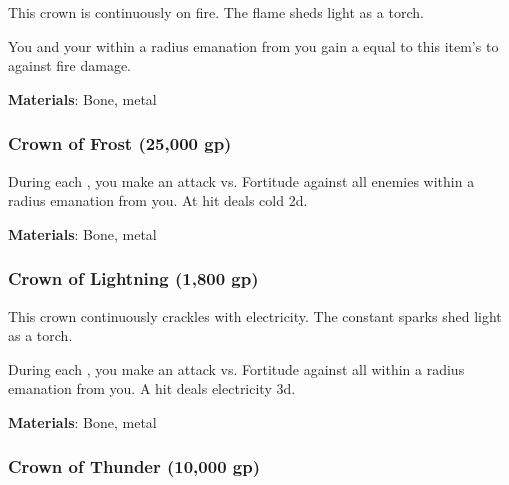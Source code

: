 This crown is continuously on fire.
The flame sheds light as a torch.

You and your  within a \arealarge radius emanation from you
gain a  equal to this item's  to  against fire damage.



\vspace{0.25em}
\textbf{Materials}: Bone, metal


\lowercase{\hypertarget{item:Crown of Frost}{}}\label{item:Crown of Frost}
\hypertarget{item:Crown of Frost}{\subsubsection{Crown of Frost\hfill{} (25,000 gp)}}

During each , you make an attack vs. Fortitude against all enemies within a \areasmall radius emanation from you.
At hit deals cold  \minus2d.



\vspace{0.25em}
\textbf{Materials}: Bone, metal


\lowercase{\hypertarget{item:Crown of Lightning}{}}\label{item:Crown of Lightning}
\hypertarget{item:Crown of Lightning}{\subsubsection{Crown of Lightning\hfill{} (1,800 gp)}}

This crown continuously crackles with electricity.
The constant sparks shed light as a torch.

During each , you make an attack vs. Fortitude against all  within a \areasmall radius emanation from you.
A hit deals electricity  \minus3d.



\vspace{0.25em}
\textbf{Materials}: Bone, metal


\lowercase{\hypertarget{item:Crown of Thunder}{}}\label{item:Crown of Thunder}
\hypertarget{item:Crown of Thunder}{\subsubsection{Crown of Thunder\hfill{} (10,000 gp)}}

